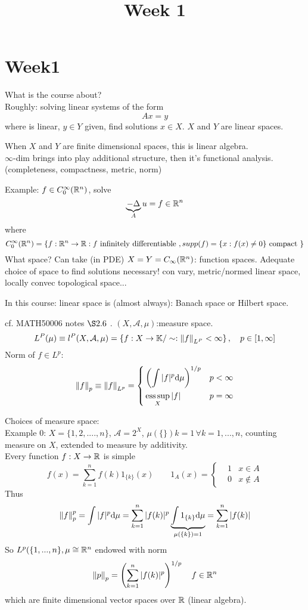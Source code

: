 \documentclass{article}
\title{Week 1}
\author{\aut}
\begin{document}
\maketitle
\section{Week1}
What is the course about?\\

Roughly: solving linear systems of the form
$$Ax=y$$
where  is linear, $y\in Y$ given, find solutions $x\in X$. $X$ and $Y$ are linear spaces.
\begin{remark}
	When $X$ and $Y$ are finite dimensional spaces, this is linear algebra.\\
	$\infty$-dim brings into play additional structure, then it's functional analysis. (completeness, compactness, metric, norm)
\end{remark}

Example: $f\in C_0^\infty (\mathbb{R}^n)$, solve
$$
	\underbrace{-\Delta}_A u=f\in\mathbb{R}^n
$$where
$$
	C_0^\infty(\mathbb{R}^n)=\left\{
	f:\mathbb{R}^n\to\mathbb{R}:f\text{ infinitely differentiable }, supp(f)=\{x:f(x)\neq0\} \text{ compact }
	\right\}
$$
What space?
Can take (in PDE) $X=Y=C_\infty(\mathbb{R}^n)$: function spaces.
Adequate choice of space to find solutions necessary!
con vary, metric/normed linear space, locally convec topological space...

In this course: linear space is (almost always): Banach space or Hilbert space.
\begin{example}
	cf. MATH50006 notes $\S2.6$ .
	$(X,\mathcal{A},\mu)$:measure space.
	$$
		L^P(\mu)\equiv l^P(X,\mathcal{A},\mu)=
		\left\{
		f:X\to\mathbb{K}/\sim:\left\|{f}\right\|_{L^P}<\infty
		\right\},\quad p\in[1,\infty]
	$$
	Norm of $f\in L^p$:
	$$
		\left\|{f}\right\|_p\equiv\left\|{f}\right\|_{L^p}=
		\left\{
		\begin{aligned}
			 & \left(\int|f|^p{\rm d}\mu\right)^{1/p} & p<
			\infty                                               \\
			 & \operatorname*{ess\,sup}_X |f|                          & p=\infty
		\end{aligned}\right.
	$$
\end{example}


Choices of measure space:\\
Example 0: $X=\{1,2,....,n\}$, $\mathcal{A}=2^X$, $\mu(\{\})k=1\,\forall k=1,...,n$, counting measure on $X$, extended to measure by additivity.\\
Every function $f:X\to\mathbb{R}$ is simple
$$
	f(x)=\sum^n_{k=1}f(k)1_{\{k\}}(x)\qquad 1_A(x)=
	\left\{\begin{aligned}
		 & 1 & x\in A    \\
		 & 0 & x\notin A
	\end{aligned}\right.
$$
Thus
$$
	\left\|{f}\right\|_p^p=\int|f|^p{\rm d}\mu=\sum_{k=1}^n|f(k)|^p
	\underbrace{\int1_{\{k\}}{\rm d}\mu}_{\mu(\{k\})=1}
	=\sum_{k=1}^n|f(k)|
$$
So $L^p(\{1,...,n\},\mu\cong\mathbb{R}^n$ endowed with norm
$$
	\left\|{p}\right\|_p=\left(\sum_{k=1}^n|f(k)|^p\right)^{1/p}\quad f\in\mathbb{R}^n
$$
which are finite dimensional vector spaces over $\mathbb{R}$ (linear algebra).
\end{document}
